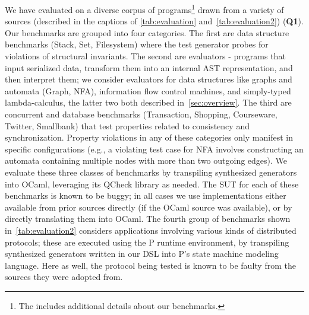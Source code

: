 We have evaluated \name{} on a diverse corpus of programs\footnote{The
\techreport{} includes additional details about our
  benchmarks.} %
drawn from a variety of sources (described in the captions of
\autoref{tab:evaluation} and~\autoref{tab:evaluation2}) %
(\textbf{Q1}). Our benchmarks are grouped into four categories.
The first are data structure benchmarks (\textsf{Stack}, \textsf{Set},
\textsf{Filesystem}) where the test generator probes for violations of
structural invariants.  The second are evaluators - programs that
input serialized data, transform them into an internal AST
representation, and then interpret them; we consider evaluators for
data structures like graphs and automata (\textsf{Graph},
\textsf{NFA}), information flow control machines, and simply-typed
lambda-calculus, the latter two both described
in~\autoref{sec:overview}.  The third are concurrent and database
benchmarks (\textsf{Transaction}, \textsf{Shopping},
\textsf{Courseware}, \textsf{Twitter}, \textsf{Smallbank}) that test
properties related to consistency and synchronization.  Property
violations in any of these categories only manifest in specific
configurations (e.g., a violating test case for \textsf{NFA} involves
constructing an automata containing multiple nodes with more than two
outgoing edges).  We evaluate these three classes of benchmarks by
transpiling synthesized generators into OCaml, leveraging its QCheck
library as needed. The SUT for each of these benchmarks is known to be
buggy; in all cases we use implementations either available from prior
sources directly (if the OCaml source was available), or by directly
translating them into OCaml.  The fourth group of benchmarks shown
in~\autoref{tab:evaluation2} considers applications involving various
kinds of distributed protocols; these are executed using the P runtime
environment, by transpiling synthesized generators written in our DSL
into P's state machine modeling language.  Here as well, the protocol
being tested is known to be faulty from the sources they were adopted
from. 

